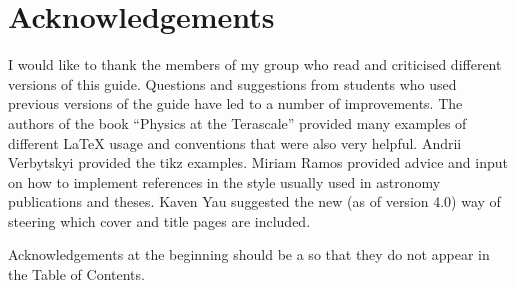 \chapter*{Acknowledgements}
\label{sec:ack1}

I would like to thank the members of my group who read and criticised
different versions of this guide. Questions and suggestions from
students who used previous versions of the guide have led to a number
of improvements. The authors of the book \enquote{Physics at the
Terascale} provided many examples of different \LaTeX{} usage and
conventions that were also very helpful. Andrii Verbytskyi provided
the tikz examples.
Miriam Ramos provided advice and input on how to implement references 
in the style usually used in astronomy publications and theses.
Kaven Yau suggested the new (as of version 4.0) way of steering which cover
and title pages are included.

Acknowledgements at the beginning should be a  so that they
do not appear in the Table of Contents.

